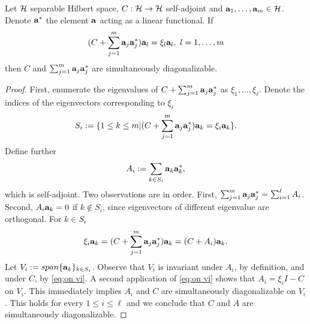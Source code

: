 \begin{lemma}\label{lemma:sim diag}
  Let $\mathcal{H}$ separable Hilbert space, $C:\mathcal{H} \to \mathcal{H}$ self-adjoint
  and $\mathbf{a}_1,\dots,\mathbf{a}_m \in \mathcal{H}$. Denote $\mathbf{a}^*$ the element
  $\mathbf{a}$ acting as a linear functional. If
  \begin{equation*}
   (C + \sum_{j=1}^m \func_j\func_j^*) \func_l = \xi_l \func_l,\ l = 1,\dots,m
  \end{equation*}
  then $C$ and $\sum_{j=1}^m \mathbf{a}_j \mathbf{a}_j^*$ are simultaneously
  diagonalizable.
\end{lemma}
\begin{proof}
  First, enumerate the eigenvalues of $C + \sum_{j=1}^m
  \mathbf{a}_j\mathbf{a}_j^*$ as $\xi_1,\dots,\xi_\ell$. Denote the indices of
  the eigenvectors corresponding to $\xi_i$
  \begin{equation*}
    S_i := \{ 1 \leq k \leq m | (C + \sum_{j=1}^m \func_j\func_j^* )\func_k = \xi_i \func_k \}.
  \end{equation*}
  Define further
  \begin{equation*}
    A_i := \sum_{k \in S_i} \func_k \func_k^*,
  \end{equation*}
  which is self-adjoint. Two observations are in order. First,
  $\sum_{j=1}^m \mathbf{a}_j\mathbf{a}_j^* = \sum_{i=1}^\ell A_i$. Second, $A_i
  \mathbf{a}_k = 0$ if $k\not \in S_i$, since eigenvectors of different
  eigenvalue are orthogonal. For $k \in S_i$
  \begin{equation}\label{eq:on vi}
    \xi_i \func_k = (C + \sum_{j=1}^m \func_j \func_j^* ) \func_k = (C + A_i) \func_k.
  \end{equation}
  Let $V_i := span \{\mathbf{a}_k \}_{k\in S_i}$. Observe that $V_i$ is
  invariant under $A_i$, by definition, and under $C$, by \eqref{eq:on
    vi}. A second application of \eqref{eq:on vi} shows that $A_i =
  \xi_iI - C$ on $V_i$. This immediately implies $A_i$ and $C$ are
  simultaneously diagonalizable on $V_i$. This holds for every $1 \leq
  i \leq \ell$ and we conclude that $C$ and $A$ are simultaneously
  diagonalizable.
\end{proof}


